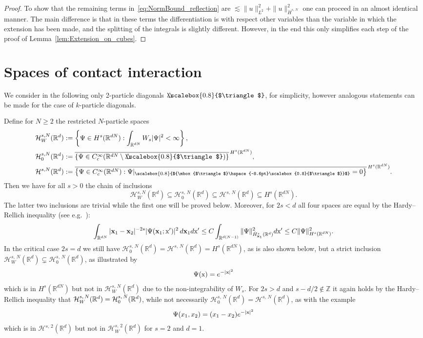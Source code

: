 \documentclass[AHL, Unicode, longabstracts, published]{cedram}
\newcommand*\R {\mathbb{R}}
\newcommand*\Z {\mathbb{Z}}
\newcommand\1{{\ensuremath {\mathds 1} }}
\newcommand{\bx}{\mathbf{x}}
\newcommand{\cH}{\mathcal{H}}
\newcommand{\sx}{\textup{x}}
\newcommand{\bDelta}{{\mbox{$\triangle$}\hspace{-8.6pt}\scalebox{0.8}{$\triangle$}}}
\newcommand{\scriptbDelta}{\scalebox{0.8}{$\bDelta$}}
\begin{document}
\begin{proof}
To show that the remaining terms in~\eqref{eq:NormBound_reflection} are $\lesssim \|u\|_{L^2}^2+\|u\|_{\dot{H}^{s,\,N}}^2$ one can proceed in an almost identical manner. The main difference is that in these terms the differentiation is with respect other variables than the variable in which the extension has been made, and the splitting of the integrals is slightly different. However, in the end this only simplifies each step of the proof of Lemma~\ref{lem:Extension_on_cubes}.
\end{proof}



\section{Spaces of contact interaction}\label{app:subspaces}

We consider in the following only 2-particle diagonals $\bDelta$, for simplicity, however analogous statements can be made for the case of $k$-particle diagonals.

Define for $N\ge 2$ the restricted $N$-particle spaces
\begin{align*}
\cH^{s,N}_W(\R^d) &:= \left\{ \Psi \in H^s(\R^{dN}): \int_{\R^{dN}} W_s |\Psi|^2 < \infty \right\}, \\
\cH^{s,N}_0(\R^d) &:= \overline{\left\{ \Psi \in C_c^\infty(\R^{dN} \setminus \bDelta) \right\} }^{\, H^s(\R^{dN})}, \\
\cH^{s,N}(\R^d) &:= \overline{\left\{ \Psi \in C_c^\infty(\R^{dN}): \Psi\rvert_{\scriptbDelta}=0 \right\} }^{\, H^s(\R^{dN})}.
\end{align*}
Then we have for all $s>0$ the chain of inclusions
\[
\cH^{s,N}_W(\R^d) \subseteq \cH^{s,\,N}_0(\R^d) \subseteq \cH^{s,\,N}(\R^d) \subseteq H^s(\R^{dN}).
\]
The latter two inclusions are trivial while the first one will be proved below. Moreover, for $2s < d$ all four spaces are equal by the Hardy--Rellich inequality (see e.g.~\cite{Yafaev-99}):
\[
\int_{\R^{dN}} |\bx_1-\bx_2|^{-2s}|\Psi(\bx_1;\sx')|^2 \,d\bx_1 d\sx'
\le C\int_{\R^{d(N-1)}} \|\Psi\|_{\dot{H}^s_{\bx_1}(\R^d)}^2 d\sx'
\le C\|\Psi\|_{H^s(\R^{dN})}^2.
\]
In the critical case $2s = d$ we still have $\cH_0^{s,\,N}(\R^d) = \cH^{s,\,N}(\R^d) = H^s(\R^{dN})$, as is also shown below, but a strict inclusion $\cH_W^{s,\,N}(\R^d) \subsetneq \cH_0^{s,\,N}(\R^d)$, as illustrated by
\[
\Psi(\sx) = e^{-|\sx|^2}
\]
which is in $H^s(\R^{dN})$ but not in $\cH_W^{s,\,N}(\R^d)$ due to the non-integrability of $W_s$. For $2s > d$ and $s-d/2 \notin \Z$ it again holds by the Hardy--Rellich inequality that $\cH_W^{s,\,N}(\R^d)\linebreak= \cH_0^{s,\,N}(\R^d)$, while not necessarily $\cH_0^{s,\,N}(\R^d) = \cH^{s,\,N}(\R^d)$, as with the example
\[
\Psi(x_1,x_2) = (x_1-x_2)e^{-|\sx|^2}
\]
which is in $\cH^{s,\,2}(\R^d)$ but not in $\cH_W^{s,\,2}(\R^d)$ for $s=2$ and $d=1$.
\end{document}
